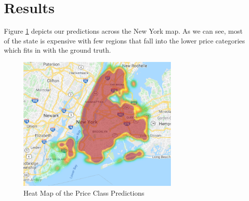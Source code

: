 \documentclass{sig-alternate}
\begin{document}
	\section{Results}
	Figure \ref{nyheatmap} depicts our predictions across the New York map. As we can see, most of the state is expensive with few regions that fall into the lower price categories which fits in with the ground truth.
	\begin{figure}[ht]
		\includegraphics[width=8cm]{heatmap.png}
		\caption{Heat Map of the Price Class Predictions}
			\label{nyheatmap}
			\centering
		\end{figure}	
\end{document}
